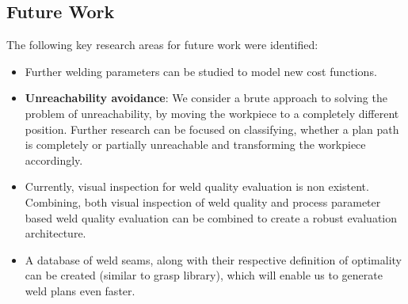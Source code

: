 \subsection{Future Work}
The following key research areas for future work were identified:
\begin{itemize}
	\item Further welding parameters can be studied to model new cost functions. 
	\item \textbf{Unreachability avoidance}: We consider a brute approach to solving the problem of unreachability, by moving the workpiece to a completely different position. Further research can be focused on classifying, whether a plan path is completely or partially unreachable and transforming the workpiece accordingly.
	\item Currently, visual inspection for weld quality evaluation is non existent. Combining, both visual inspection of weld quality and process parameter based weld quality evaluation can be combined to create a robust evaluation architecture.
	\item A database of weld seams, along with their respective definition of optimality can be created (similar to grasp library), which will enable us to generate weld plans even faster. 
\end{itemize}
